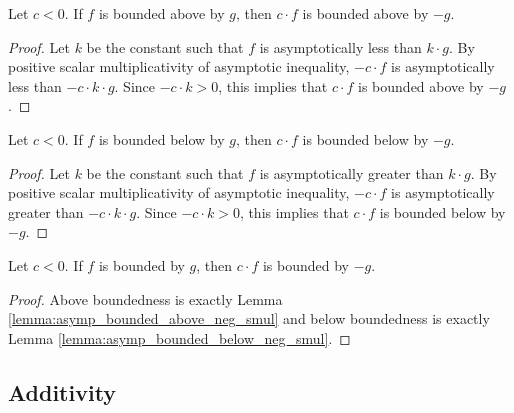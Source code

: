 \begin{lemma}
    \label{lemma:asymp_bounded_above_neg_smul}
    \leanok
    Let $c < 0$. If $f$ is bounded above by $g$, then $c \cdot f$ is bounded
    above by $-g$.
\end{lemma}

\begin{proof}
    \leanok
    Let $k$ be the constant such that $f$ is asymptotically less than $k \cdot g$.
    By positive scalar multiplicativity of asymptotic inequality, $-c \cdot f$ is 
    asymptotically less than $-c \cdot k \cdot g$. Since $-c \cdot k > 0$, this implies
    that $c \cdot f$ is bounded above by $-g$.
\end{proof}

\begin{lemma}
    \label{lemma:asymp_bounded_below_neg_smul}
    \leanok
    Let $c < 0$. If $f$ is bounded below by $g$, then $c \cdot f$ is bounded
    below by $-g$.
\end{lemma}

\begin{proof}
    \leanok
    Let $k$ be the constant such that $f$ is asymptotically greater than $k \cdot g$.
    By positive scalar multiplicativity of asymptotic inequality, $-c \cdot f$ is 
    asymptotically greater than $-c \cdot k \cdot g$. Since $-c \cdot k > 0$, this implies
    that $c \cdot f$ is bounded below by $-g$.
\end{proof}

\begin{lemma}
    \label{lemma:asymp_bounded_neg_smul}
    \leanok
    Let $c < 0$. If $f$ is bounded by $g$, then $c \cdot f$ is bounded by $-g$.
\end{lemma}

\begin{proof}
    \leanok
    Above boundedness is exactly Lemma \ref{lemma:asymp_bounded_above_neg_smul} and
    below boundedness is exactly Lemma \ref{lemma:asymp_bounded_below_neg_smul}.
\end{proof}


\subsection{Additivity}

